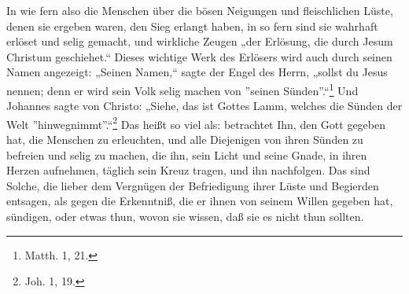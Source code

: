 In wie fern also die Menschen über die bösen Neigungen und fleischlichen Lüste, denen sie ergeben waren, den Sieg erlangt haben, in so fern sind sie wahrhaft erlöset und selig gemacht, und wirkliche Zeugen „der Erlösung, die durch Jesum Christum geschiehet.“ Dieses wichtige Werk des Erlösers wird auch durch seinen Namen angezeigt: „Seinen Namen,“ sagte der Engel des Herrn, „sollst du Jesus nennen; denn er wird sein Volk selig machen von ''seinen Sünden''.“\footnote{Matth. 1, 21.} Und Johannes sagte von Christo: „Siehe, das ist Gottes Lamm, welches die Sünden der Welt ''hinwegnimmt''.“\footnote{Joh. 1, 19.} Das heißt so viel als: betrachtet Ihn, den Gott gegeben hat, die Menschen zu erleuchten, und alle Diejenigen von ihren Sünden zu befreien und selig zu machen, die ihn, sein Licht und seine Gnade, in ihren Herzen aufnehmen, täglich sein Kreuz tragen, und ihn nachfolgen. Das sind Solche, die lieber dem Vergnügen der Befriedigung ihrer Lüste und Begierden entsagen, als gegen die Erkenntniß, die er ihnen von seinem Willen gegeben hat, sündigen, oder etwas thun, wovon sie wissen, daß sie es nicht thun sollten.




